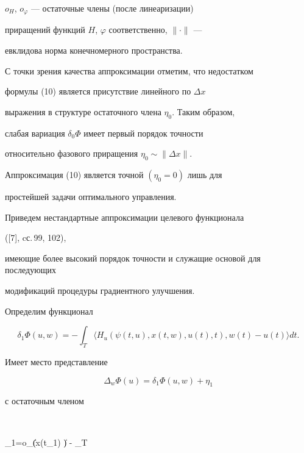 $o_{H}$, $o_{\varphi}$ --- остаточные члены (после линеаризации)


приращений функций $H$, $\varphi$ соответственно, $\|\cdot\|$ ---


евклидова норма конечномерного пространства.





С точки зрения качества аппроксимации отметим, что недостатком


формулы (10) является присутствие линейного по $\Delta x$


выражения в структуре остаточного члена $\eta_{0}$. Таким образом,


слабая вариация $\delta_{0} \Phi$ имеет первый порядок точности


относительно фазового приращения $\eta_{0} \sim \| \Delta x \|$.


Аппроксимация (10) является точной $(\eta_{0}=0)$ лишь для


простейшей задачи оптимального управления.





Приведем нестандартные аппроксимации целевого функционала 


([7], cс.\,99, 102), 


имеющие более высокий порядок точности и служащие основой для последующих 


модификаций процедуры градиентного улучшения.





Определим функционал 


\begin{equation}


\delta_{1} \Phi(u,w)=- \int_{T} \langle H_{u} (\psi(t,u), x(t,w), u(t), t), 


w(t) - u(t)\rangle dt.


\end{equation}


Имеет место представление


\begin{equation}


\Delta_{w} \Phi(u)=\delta_{1} \Phi(u,w)+\eta_{1}


\end{equation}


с остаточным членом


$$


\eta_{1}=o_{\varphi}(\| \Delta x(t_{1}) \|) - \int_{T}



